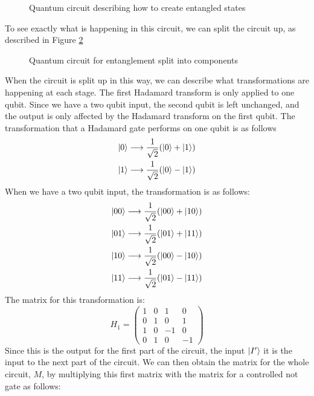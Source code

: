 \begin{figure}[!htb]
\centering
\resizebox{3cm}{!}{}
\caption{Quantum circuit describing how to create entangled states}
\label{fig:entangle}
\end{figure}
To see exactly what is happening in this circuit, we can split the circuit up, as described in Figure \ref{fig:splitEntangle} 
\begin{figure}[!htb]
\centering
\resizebox{5cm}{!}{}
\caption{Quantum circuit for entanglement split into components}
\label{fig:splitEntangle}
\end{figure}
When the circuit is split up in this way, we can describe what transformations are happening at each stage. The first Hadamard transform is only applied to one qubit. Since we have a two qubit input, the second qubit is left unchanged, and the output is only affected by the Hadamard transform on the first qubit. The transformation that a Hadamard gate performs on one qubit is as follows \begin{align*}
    \ket{0} \longrightarrow \frac{1}{\sqrt{2}}(\ket{0} + \ket{1})\\
    \ket{1} \longrightarrow \frac{1}{\sqrt{2}}(\ket{0} - \ket{1})
\end{align*}
When we have a two qubit input, the transformation is as follows:
\begin{align*}
    \ket{00} \longrightarrow \frac{1}{\sqrt{2}}(\ket{00} + \ket{10})\\
    \ket{01} \longrightarrow \frac{1}{\sqrt{2}}(\ket{01} + \ket{11})\\
    \ket{10} \longrightarrow \frac{1}{\sqrt{2}}(\ket{00} - \ket{10})\\
    \ket{11} \longrightarrow \frac{1}{\sqrt{2}}(\ket{01} - \ket{11})
\end{align*}
The matrix for this transformation is:
$$ H_1 = 
\begin{pmatrix}
1 & 0 & 1 & 0\\
0 & 1 & 0 & 1\\
1 & 0 & -1 & 0\\
0 & 1 & 0 & -1
\end{pmatrix}
$$
Since this is the output for the first part of the circuit, the input $\ket{I'}$ it is the input to the next part of the circuit. We can then obtain the matrix for the whole circuit, $M$, by multiplying this first matrix with the matrix for a controlled not gate as follows:
